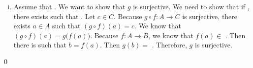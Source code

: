 \documentclass[12pt,letterpaper]{exam}
\newcommand{\blank}[1]{\underline{\hspace{#1}}} %
\begin{document}
\begin{questions}
\begin{enumerate}[(i)]
\item Assume that \blank{5.5cm}. We want to show that $g$ is surjective. \pspace We need to show that if \blank{3cm}, there exists \blank{3cm} such that \pspace \blank{4cm}. Let $c \in C$. Because $g \circ f: A \to C$ is surjective, there exists \pspace $a \in A$ such that $(g \circ f)(a)= c$. We know that $(g \circ f)(a)= g\big( f(a) \big)$. Because \pspace $f: A \to B$, we know that $f(a) \in $ \blank{3cm}. Then there is \blank{3cm} \pspace such that $b= f(a)$. Then $g(b)= $ \blank{4cm}. Therefore, $g$ is surjective. 
\end{enumerate} \qed


\end{questions}
\end{document}
